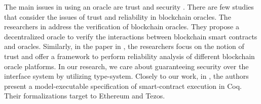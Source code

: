 \documentclass[a4paper]{llncs}
\begin{document}
The main issues in using an oracle are trust and security \cite{trustworthy}. There are few studies that consider the issues of trust and reliability in blockchain oracles. The researchers in \cite{reliable-oracle} address the verification of blockchain oracles. They propose a decentralized oracle to verify the interactions between blockchain smart contracts and oracles. Similarly, in the paper in \cite{reliablity-oracles}, the researchers focus on the notion of trust and offer a framework to perform reliability analysis of different blockchain oracle platforms. In our research, we care about guaranteeing security over the interface system by utilizing type-system. Closely to our work, in \cite{interact-coq}, the authors present a model-executable specification of smart-contract execution in Coq. Their formalizations target to Ethereum and Tezos. 



\end{document}
